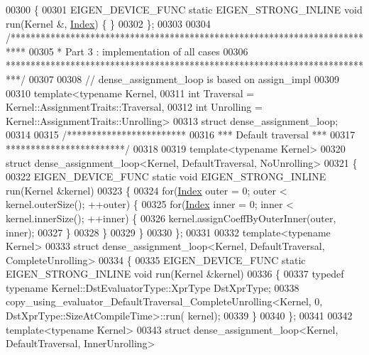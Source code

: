 \begin{DoxyCode}
00300 \{
00301   EIGEN\_DEVICE\_FUNC \textcolor{keyword}{static} EIGEN\_STRONG\_INLINE \textcolor{keywordtype}{void} run(Kernel &, \hyperlink{namespace_eigen_a62e77e0933482dafde8fe197d9a2cfde}{Index}) \{ \}
00302 \};
00303 
00304 \textcolor{comment}{/***************************************************************************}
00305 \textcolor{comment}{* Part 3 : implementation of all cases}
00306 \textcolor{comment}{***************************************************************************/}
00307 
00308 \textcolor{comment}{// dense\_assignment\_loop is based on assign\_impl}
00309 
00310 \textcolor{keyword}{template}<\textcolor{keyword}{typename} Kernel,
00311          \textcolor{keywordtype}{int} Traversal = Kernel::AssignmentTraits::Traversal,
00312          \textcolor{keywordtype}{int} Unrolling = Kernel::AssignmentTraits::Unrolling>
00313 \textcolor{keyword}{struct }dense\_assignment\_loop;
00314 
00315 \textcolor{comment}{/************************}
00316 \textcolor{comment}{*** Default traversal ***}
00317 \textcolor{comment}{************************/}
00318 
00319 \textcolor{keyword}{template}<\textcolor{keyword}{typename} Kernel>
00320 \textcolor{keyword}{struct }dense\_assignment\_loop<Kernel, DefaultTraversal, NoUnrolling>
00321 \{
00322   EIGEN\_DEVICE\_FUNC \textcolor{keyword}{static} \textcolor{keywordtype}{void} EIGEN\_STRONG\_INLINE run(Kernel &kernel)
00323   \{
00324     \textcolor{keywordflow}{for}(\hyperlink{namespace_eigen_a62e77e0933482dafde8fe197d9a2cfde}{Index} outer = 0; outer < kernel.outerSize(); ++outer) \{
00325       \textcolor{keywordflow}{for}(\hyperlink{namespace_eigen_a62e77e0933482dafde8fe197d9a2cfde}{Index} inner = 0; inner < kernel.innerSize(); ++inner) \{
00326         kernel.assignCoeffByOuterInner(outer, inner);
00327       \}
00328     \}
00329   \}
00330 \};
00331 
00332 \textcolor{keyword}{template}<\textcolor{keyword}{typename} Kernel>
00333 \textcolor{keyword}{struct }dense\_assignment\_loop<Kernel, DefaultTraversal, CompleteUnrolling>
00334 \{
00335   EIGEN\_DEVICE\_FUNC \textcolor{keyword}{static} EIGEN\_STRONG\_INLINE \textcolor{keywordtype}{void} run(Kernel &kernel)
00336   \{
00337     \textcolor{keyword}{typedef} \textcolor{keyword}{typename} Kernel::DstEvaluatorType::XprType DstXprType;
00338     copy\_using\_evaluator\_DefaultTraversal\_CompleteUnrolling<Kernel, 0, DstXprType::SizeAtCompileTime>::run(
      kernel);
00339   \}
00340 \};
00341 
00342 \textcolor{keyword}{template}<\textcolor{keyword}{typename} Kernel>
00343 \textcolor{keyword}{struct }dense\_assignment\_loop<Kernel, DefaultTraversal, InnerUnrolling>

\end{DoxyCode}
